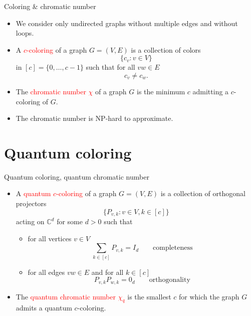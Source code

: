 \documentclass{beamer}
\newcommand{\C}{\mathbb{C}}
\renewcommand{\>}{\rangle}
\newcommand{\<}{\langle}
\begin{document}
\begin{frame}{Coloring \& chromatic number}

\begin{itemize}
\item We consider only undirected graphs without multiple edges and without loops.

\item A \textcolor{red}{$c$-coloring} of a graph $G=(V,E)$ is a collection of colors 
\[
\{ c_v : v \in V\}
\]
in $[c]=\{0,\ldots,c-1\}$ such that for all $vw\in E$
\[
c_v \neq c_w.
\]

\item The \textcolor{red}{chromatic number $\chi$} of a graph $G$ is the minimum $c$ admitting a $c$-coloring of $G$.

\item The chromatic number is NP-hard to approximate. 
\end{itemize}
\end{frame}

%

\section{Quantum coloring}

\begin{frame}{Quantum coloring, quantum chromatic number}

\begin{itemize}
\item A \textcolor{red}{quantum $c$-coloring} of a graph $G=(V,E)$ is a collection of orthogonal projectors 
\[
\{ P_{v,k} : v \in V, k \in [c] \}
\]
acting on $\C^d$ for some $d>0$ such that
\begin{itemize}
\item for all vertices $v\in V$
\[
\sum_{k\in [c]} P_{v,k} = I_d \quad \quad \mbox{completeness}
\]
\item for all edges $vw\in E$ and for all $k\in [c]$
\[
P_{v,k} P_{w,k} = 0_d \quad \quad \mbox{orthogonality}
\]
\end{itemize}

\item The \textcolor{red}{quantum chromatic number $\chi_q$} is the smallest $c$ for which the graph $G$ admits a quantum $c$-coloring.

\end{itemize}

\end{frame}
\end{document}
